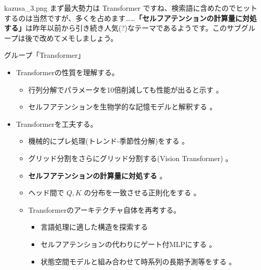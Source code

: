 \documentclass[b5paper,xelatex,ja=standard,10pt]{bxjsarticle}
\begin{document}
\begin{SERIFU}[colback=PaleIris, colbacktitle=PaleIris2]{kazusa_3.png}
まず最大勢力は Transformer ですね、検索語に含めたのでヒットするのは当然ですが、多くを占めます……\textbf{「セルフアテンションの計算量に対処する」}は昨年以前から引き続き人気(?)なテーマであるようです。このサブグループは後で改めてメモしましょう。
\end{SERIFU}

\vspace{1pt}
\begin{PROP}[colback=White, left=0pt]{グループ「Transformer」}
\begin{itemize}
  \item Transformerの性質を理解する。
    \begin{itemize}
    \item 行列分解でパラメータを10倍削減しても性能が出ると示す \cite{AliakbarPanahi2021}。
    \item セルフアテンションを生物学的な記憶モデルと解釈する \cite{TrentonBricken2021}。
  \end{itemize}
  \item Transformerを工夫する。
  \begin{itemize}
    \item 機械的にプレ処理(トレンド-季節性分解)をする \cite{HaixuWu2021}。
    \item グリッド分割をさらにグリッド分割する(Vision Transformer) \cite{KaiHan2021}。
    \item \textbf{セルフアテンションの計算量に対処する} \cite{YifanChen2021} \cite{XuezheMa2021} \cite{SubhabrataDutta2021} \cite{SebastianJaszczur2021} \cite{BeidiChen2021} \cite{ChenZhu2021} \cite{HongyuRen2021} \cite{ShengjieLuo2021}。
    \item ヘッド間で $Q, K$ の分布を一致させる正則化をする \cite{ShujianZhang2021}。
    \item Transformerのアーキテクチャ自体を再考する。
    \begin{itemize}
      \item 言語処理に適した構造を探索する \cite{DavidSo2021}
      \item セルフアテンションの代わりにゲート付MLPにする \cite{HanxiaoLiu2021}。
      \item 状態空間モデルと組み合わせて時系列の長期予測等をする \cite{BinhTang2021}。
    \end{itemize}
  \end{itemize}
\end{itemize}
\end{PROP}
\vspace{1pt}
\end{document}

